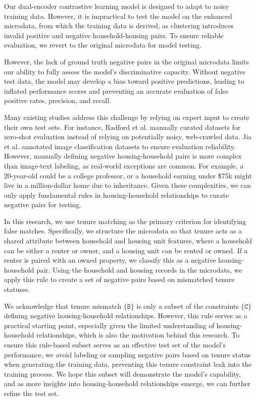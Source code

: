 \documentclass[]{nature_mod}
\begin{document}
Our dual-encoder contrastive learning model is designed to adapt to noisy training data. However, it is impractical to test the model on the enhanced microdata, from which the training data is derived, as clustering introduces invalid positive and negative household-housing pairs. To ensure reliable evaluation, we revert to the original microdata for model testing.

However, the lack of ground truth negative pairs in the original microdata limits our ability to fully assess the model’s discriminative capacity. Without negative test data, the model may develop a bias toward positive predictions, leading to inflated performance scores and preventing an accurate evaluation of false positive rates, precision, and recall.

Many existing studies address this challenge by relying on expert input to create their own test sets. For instance, Radford et al. \cite{radford2021learning} manually curated datasets for zero-shot evaluation instead of relying on potentially noisy, web-crawled data. Jia et al. \cite{jia2021scaling} annotated image classification datasets to ensure evaluation reliability. However, manually defining negative housing-household pairs is more complex than image-text labeling, as real-world exceptions are common. For example, a 20-year-old could be a college professor, or a household earning under \$75k might live in a million-dollar home due to inheritance. Given these complexities, we can only apply fundamental rules in housing-household relationships to curate negative pairs for testing.

In this research, we use tenure matching as the primary criterion for identifying false matches. Specifically, we structure the microdata so that tenure acts as a shared attribute between household and housing unit features, where a household can be either a renter or owner, and a housing unit can be rented or owned. If a renter is paired with an owned property, we classify this as a negative housing-household pair. Using the household and housing records in the microdata, we apply this rule to create a set of negative pairs based on mismatched tenure statuses.

We acknowledge that tenure mismatch $\{\mathtt{S}\}$ is only a subset of the constraints $\{\mathtt{C}\}$ defining negative housing-household relationships. However, this rule serves as a practical starting point, especially given the limited understanding of housing-household relationships, which is also the motivation behind this research. To ensure this rule-based subset serves as an effective test set of the model’s performance, we avoid labeling or sampling negative pairs based on tenure status when generating the training data, preventing this tenure constraint leak into the training process. We hope this subset will demonstrate the model's capability, and as more insights into housing-household relationships emerge, we can further refine the test set.
\end{document}
